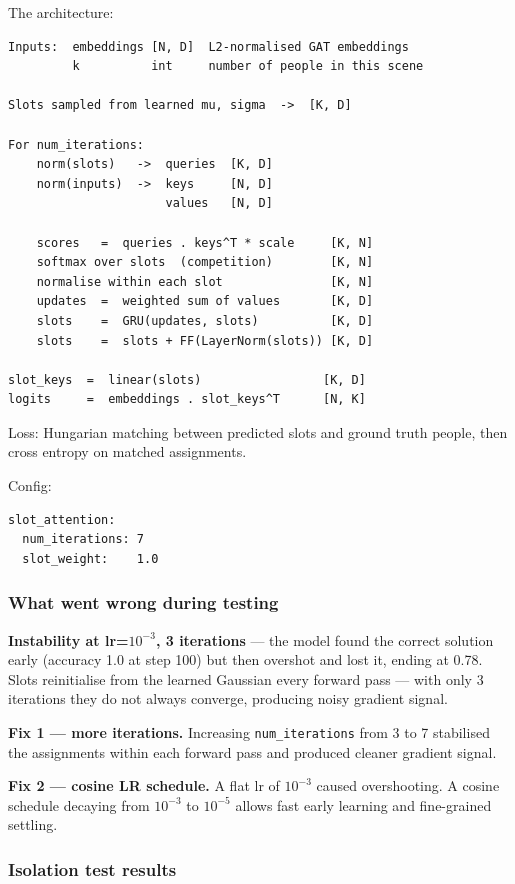 The architecture:
\begin{verbatim}
Inputs:  embeddings [N, D]  L2-normalised GAT embeddings
         k          int     number of people in this scene

Slots sampled from learned mu, sigma  ->  [K, D]

For num_iterations:
    norm(slots)   ->  queries  [K, D]
    norm(inputs)  ->  keys     [N, D]
                      values   [N, D]

    scores   =  queries . keys^T * scale     [K, N]
    softmax over slots  (competition)        [K, N]
    normalise within each slot               [K, N]
    updates  =  weighted sum of values       [K, D]
    slots    =  GRU(updates, slots)          [K, D]
    slots    =  slots + FF(LayerNorm(slots)) [K, D]

slot_keys  =  linear(slots)                 [K, D]
logits     =  embeddings . slot_keys^T      [N, K]
\end{verbatim}

Loss: Hungarian matching between predicted slots and ground truth people, then cross entropy on matched assignments.

Config:
\begin{verbatim}
slot_attention:
  num_iterations: 7
  slot_weight:    1.0
\end{verbatim}


\subsubsection{What went wrong during testing}

\textbf{Instability at lr=$10^{-3}$, 3 iterations} --- the model found the correct solution early (accuracy 1.0 at step 100) but then overshot and lost it, ending at 0.78. Slots reinitialise from the learned Gaussian every forward pass --- with only 3 iterations they do not always converge, producing noisy gradient signal.

\textbf{Fix 1 --- more iterations.} Increasing \texttt{num\_iterations} from 3 to 7 stabilised the assignments within each forward pass and produced cleaner gradient signal.

\textbf{Fix 2 --- cosine LR schedule.} A flat lr of $10^{-3}$ caused overshooting. A cosine schedule decaying from $10^{-3}$ to $10^{-5}$ allows fast early learning and fine-grained settling.


\subsubsection{Isolation test results}

